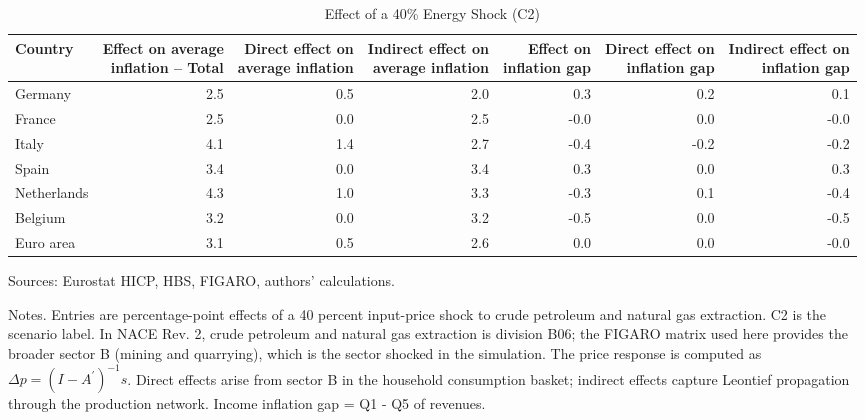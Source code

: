 \documentclass[11pt]{article}
\begin{document}
\begin{table}[H]
\centering
\caption{Effect of a 40\% Energy Shock (C2)}
\scriptsize
\setlength{\tabcolsep}{4.2pt}
\begin{tabular}{lrrrrrr}
\toprule
Country & \shortstack{Effect on average\\inflation -- Total} & \shortstack{Direct effect on\\average inflation} & \shortstack{Indirect effect on\\average inflation} & \shortstack{Effect on\\inflation gap} & \shortstack{Direct effect on\\inflation gap} & \shortstack{Indirect effect on\\inflation gap}
 \\
\midrule
Germany & 2.5 & 0.5 & 2.0 & 0.3 & 0.2 & 0.1
 \\
France & 2.5 & 0.0 & 2.5 & -0.0 & 0.0 & -0.0
 \\
Italy & 4.1 & 1.4 & 2.7 & -0.4 & -0.2 & -0.2
 \\
Spain & 3.4 & 0.0 & 3.4 & 0.3 & 0.0 & 0.3
 \\
Netherlands & 4.3 & 1.0 & 3.3 & -0.3 & 0.1 & -0.4
 \\
Belgium & 3.2 & 0.0 & 3.2 & -0.5 & 0.0 & -0.5
 \\
Euro area & 3.1 & 0.5 & 2.6 & 0.0 & 0.0 & -0.0
 \\
\bottomrule
\end{tabular}
\par\vspace{0.35em}\footnotesize\noindent Sources: Eurostat HICP, HBS, FIGARO, authors' calculations.
\par\vspace{0.25em}\footnotesize\noindent Notes. Entries are percentage-point effects of a 40 percent input-price shock to crude petroleum and natural gas extraction. C2 is the scenario label. In NACE Rev. 2, crude petroleum and natural gas extraction is division B06; the FIGARO matrix used here provides the broader sector B (mining and quarrying), which is the sector shocked in the simulation. The price response is computed as $\Delta p = (I - A^{\prime})^{-1}s$. Direct effects arise from sector B in the household consumption basket; indirect effects capture Leontief propagation through the production network. Income inflation gap = Q1 - Q5 of revenues.
\end{table}
\vspace{0.6em}
\end{document}
